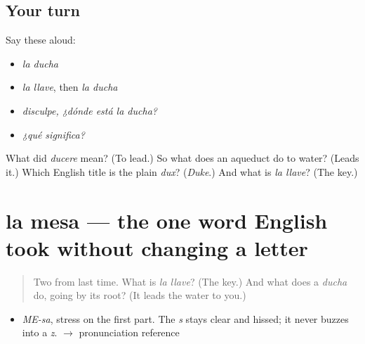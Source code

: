 \subsection*{Your turn}
Say these aloud:

\begin{itemize}
\raggedright
  \item \emph{la ducha}
  \item \emph{la llave}, then \emph{la ducha}
  \item \emph{disculpe, ¿dónde está la ducha?}
  \item \emph{¿qué significa?}
\end{itemize}

\begin{tcolorbox}[breakable,colback=teal!4,colframe=teal!35!black,title={Before you move on}]
What did \emph{ducere} mean? (To lead.) So what does an aqueduct do to water? (Leads it.) Which English title is the plain \emph{dux}? (\emph{Duke}.) And what is \emph{la llave}? (The key.)
\end{tcolorbox}
\section[la mesa]{la mesa — the one word English took without changing a letter}

\label{lesson:ES-C310-mesa}



\begin{quote}
Two from last time. What is \emph{la llave}? (The key.) And what does a \emph{ducha} do, going by its root? (It leads the water to you.)
\end{quote}

\begin{sounds}
\begin{itemize}
\raggedright
  \item \emph{ME-sa}, stress on the first part. The \emph{s} stays clear and hissed; it never buzzes into a \emph{z}. $\to$ pronunciation reference
\end{itemize}
\end{sounds}

